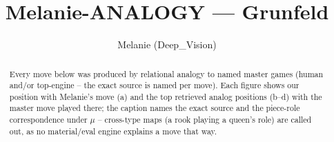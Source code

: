\documentclass[11pt]{article}
\title{Melanie-ANALOGY — Grunfeld}
\author{Melanie (Deep\_Vision)}
\date{}
\begin{document}
\maketitle

\begin{abstract}Every move below was produced by relational analogy to named master games (human and/or top-engine -- the exact source is named per move). Each figure shows our position with Melanie's move (a) and the top retrieved analog positions (b--d) with the master move played there; the caption names the exact source and the piece-role correspondence under $\mu$ -- cross-type maps (a rook playing a queen's role) are called out, as no material/eval engine explains a move that way.\end{abstract}

\begin{figure}[p]\centering
\begin{subfigure}{0.46\textwidth}\centering
\resizebox{\linewidth}{!}{%
\newchessgame
\chessboard[
  setfen={rnbqk2r/ppp1ppbp/6p1/8/3PP3/2P5/P4PPP/R1BQKBNR w KQkq - 1 7},
  showmover=false,
  pgfstyle=straightmove, color=movearrow, markmove={f1-c4}
]}
\caption{}
\end{subfigure}\hfill
\begin{subfigure}{0.46\textwidth}\centering
\resizebox{\linewidth}{!}{%
\newchessgame
\chessboard[
  setfen={rnbqk2r/ppp1ppbp/6p1/8/3PP3/2P5/P4PPP/R1BQKBNR w KQkq - 1 7},
  showmover=false,
  pgfstyle=straightmove, color=movearrow, markmove={f1-c4}
]}
\caption{}
\end{subfigure}
\\[4pt]
\begin{subfigure}{0.46\textwidth}\centering
\resizebox{\linewidth}{!}{%
\newchessgame
\chessboard[
  setfen={rnbqk2r/ppp1ppbp/6p1/8/3PP3/2P5/P4PPP/R1BQKBNR w KQkq - 1 7},
  showmover=false,
  pgfstyle=straightmove, color=movearrow, markmove={f1-c4}
]}
\caption{}
\end{subfigure}\hfill
\begin{subfigure}{0.46\textwidth}\centering
\resizebox{\linewidth}{!}{%
\newchessgame
\chessboard[
  setfen={rnbqk2r/ppp1ppbp/6p1/8/3PP3/2P5/P4PPP/R1BQKBNR w KQkq - 1 7},
  showmover=false,
  pgfstyle=straightmove, color=movearrow, markmove={f1-c4}
]}
\caption{}
\end{subfigure}

\end{figure}
\end{document}
